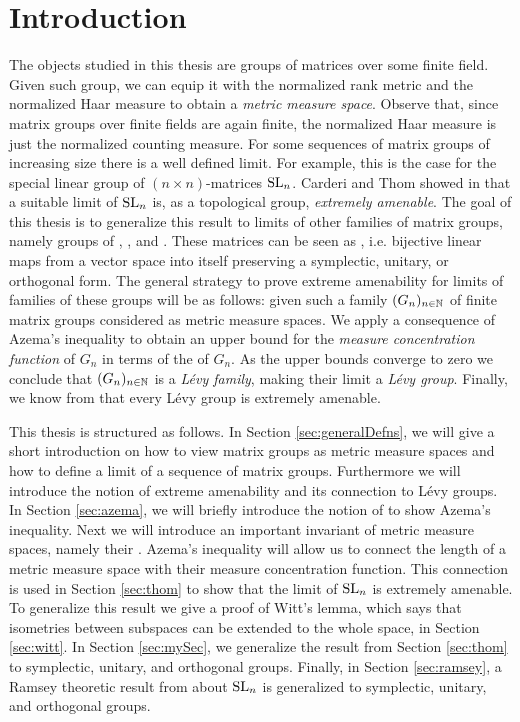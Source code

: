 
\section{Introduction}
The objects studied in this thesis are groups of matrices over some finite field.
Given such group, we can equip it with the normalized rank metric and the normalized Haar measure to obtain a \emph{metric measure space}. Observe that, since matrix groups over finite fields are again finite, the normalized Haar measure is just the normalized counting measure.
For some sequences of matrix groups of increasing size there is a well defined limit. For example, this is the case for the special linear group of $(n\times n)$-matrices $\operatorname{SL}_n$.
Carderi and Thom  showed in \cite{thom} that a suitable limit of $\operatorname{SL}_n$ is, as a topological group, \emph{extremely amenable}. The goal of this thesis is to generalize this result to limits of other families of matrix groups, namely groups of , , and .  
These matrices can be seen as , i.e. bijective linear maps from a vector space into itself preserving a symplectic, unitary, or orthogonal form.
The general strategy to prove extreme amenability for limits of families of these groups will be as follows: given such a family $(G_n)_{n\in\mathbb{N}}$ of finite matrix groups considered as metric measure spaces. We apply a consequence of Azema's inequality \cite{Azema} to obtain an upper bound for the \emph{measure concentration function} of $G_n$ in terms of the  of $G_n$.
As the upper bounds converge to zero we conclude that $(G_n)_{n\in\mathbb{N}}$ is a \emph{L\'{e}vy family}, making their limit a \emph{L\'{e}vy group}. Finally, we know from \cite{Levy} that every L\'{e}vy group is extremely amenable.

This thesis is structured as follows. In Section \ref{sec:generalDefns}, we will give a short introduction on how to view matrix groups as metric measure spaces and how to define a limit of a sequence of matrix groups. Furthermore we will introduce the notion of extreme amenability and its connection to L\'evy groups. In Section \ref{sec:azema}, we will briefly introduce the notion of  to show Azema's inequality. Next we will introduce an important invariant of metric measure spaces, namely their . Azema's inequality will allow us to connect the length of a metric measure space with their measure concentration function. This connection is used in Section \ref{sec:thom} to show that the limit of $\operatorname{SL}_n$ is extremely amenable. To generalize this result we give a proof of Witt's lemma, which says that isometries between subspaces can be extended to the whole space, in Section \ref{sec:witt}. In Section \ref{sec:mySec}, we generalize the result from Section \ref{sec:thom} to symplectic, unitary, and orthogonal groups. Finally, in Section \ref{sec:ramsey}, a Ramsey theoretic result from \cite{thom} about $\operatorname{SL}_n$ is generalized to symplectic, unitary, and orthogonal groups.

